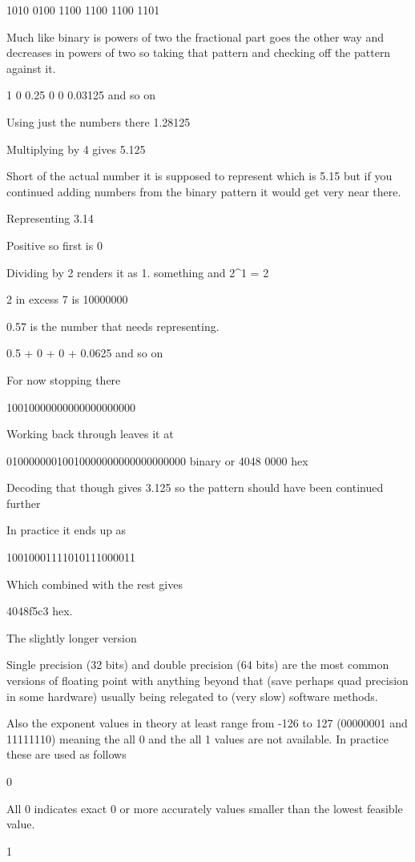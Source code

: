 \documentclass[
]{book}
\begin{document}
1010 0100 1100 1100 1100 1101

Much like binary is powers of two the fractional part goes the other way and decreases in powers of two so taking that pattern and checking off the pattern against it.

1 0 0.25 0 0 0.03125 and so on

Using just the numbers there 1.28125

Multiplying by 4 gives 5.125

Short of the actual number it is supposed to represent which is 5.15 but if you continued adding numbers from the binary pattern it would get very near there.

Representing 3.14

Positive so first is 0

Dividing by 2 renders it as 1. something and 2\^{}1 = 2

2 in excess 7 is 10000000

0.57 is the number that needs representing.

0.5 + 0 + 0 + 0.0625 and so on

For now stopping there

10010000000000000000000

Working back through leaves it at

01000000010010000000000000000000 binary or 4048 0000 hex

Decoding that though gives 3.125 so the pattern should have been continued further

In practice it ends up as

10010001111010111000011

Which combined with the rest gives

4048f5c3 hex.

The slightly longer version

Single precision (32 bits) and double precision (64 bits) are the most common versions of floating point with anything beyond that (save perhaps quad precision in some hardware) usually being relegated to (very slow) software methods.

Also the exponent values in theory at least range from -126 to 127 (00000001 and 11111110) meaning the all 0 and the all 1 values are not available. In practice these are used as follows

0

All 0 indicates exact 0 or more accurately values smaller than the lowest feasible value.

1
\end{document}
